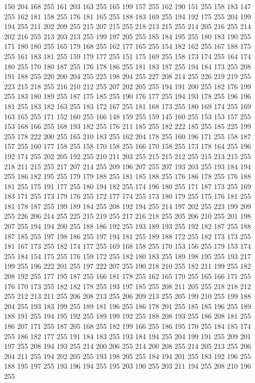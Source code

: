 150 204 168 255 161 203 163 255 165 199 157 255 162 190 151 255 158 183 147 255 162 181 158 255 176 181 165 255 188 183 169 255 194 192 175 255 204 199 194 255 211 202 209 255 215 207 215 255 218 213 215 255 214 205 216 255 214 202 216 255 213 203 213 255
199 197 205 255 185 184 195 255 180 183 190 255 171 180 180 255 165 179 168 255 162 177 165 255 154 182 162 255 167 188 175 255 161 183 181 255 159 179 177 255 151 175 169 255 158 173 174 255 164 174 180 255 170 180 187 255 176 178 186 255 181 183 187 255
194 184 173 255 208 191 188 255 220 200 204 255 225 198 204 255 227 208 214 255 226 219 219 255 223 215 218 255 216 210 212 255 207 202 205 255 194 191 200 255 182 176 199 255 183 180 189 255 187 175 185 255 190 176 177 255 194 193 178 255 196 196 181 255
183 182 163 255 183 172 167 255 181 168 173 255 180 169 174 255 169 163 165 255 171 152 160 255 166 148 159 255 159 145 160 255 153 153 157 255 153 168 166 255 168 193 182 255 176 211 185 255 182 222 185 255 185 225 199 255 178 222 200 255 165 210 183 255
162 204 178 255 160 196 171 255 158 187 157 255 160 177 158 255 158 170 158 255 166 170 158 255 173 178 164 255 196 192 174 255 202 205 192 255 210 211 203 255 215 215 212 255 215 213 215 255 218 211 215 255 217 207 214 255 209 196 207 255 207 193 203 255
193 184 194 255 186 182 195 255 179 179 188 255 181 185 188 255 176 186 178 255 176 188 181 255 175 191 177 255 180 194 182 255 174 196 180 255 171 187 173 255 169 183 171 255 173 179 176 255 172 177 174 255 173 180 179 255 175 176 181 255 181 178 187 255
199 189 184 255 208 192 194 255 214 197 202 255 223 199 209 255 226 206 214 255 225 215 219 255 217 216 218 255 205 206 210 255 201 198 207 255 194 194 200 255 188 186 192 255 193 189 193 255 192 182 187 255 188 187 185 255 197 198 186 255 197 194 181 255
189 188 172 255 182 173 173 255 181 167 173 255 182 174 177 255 169 168 158 255 170 153 156 255 179 153 174 255 184 154 175 255 176 159 172 255 182 180 183 255 189 198 195 255 193 217 199 255 196 222 201 255 197 222 207 255 190 218 210 255 182 211 199 255
182 208 192 255 177 195 187 255 166 181 178 255 162 165 170 255 165 166 171 255 176 170 173 255 182 182 178 255 193 197 185 255 208 211 205 255 218 218 212 255 212 213 211 255 206 208 213 255 206 209 213 255 205 199 210 255 199 188 204 255 193 183 199 255
189 181 196 255 186 178 201 255 185 185 196 255 189 188 191 255 194 195 192 255 189 199 192 255 188 208 193 255 186 208 181 255 186 207 171 255 187 205 168 255 182 199 166 255 186 195 170 255 184 185 174 255 186 182 177 255 191 184 183 255 193 184 194 255
204 199 191 255 209 201 197 255 208 194 193 255 214 200 206 255 214 200 208 255 214 205 213 255 206 204 211 255 194 202 205 255 193 198 205 255 184 194 201 255 183 192 196 255 188 195 197 255 193 196 194 255 195 203 190 255 203 211 194 255 208 210 196 255
